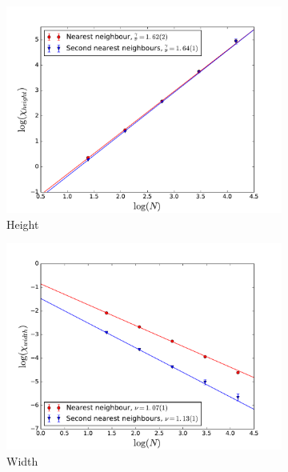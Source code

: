 \documentclass[twoside]{article}
\begin{document}
\begin{figure}[!tpb]
  \begin{subfigure}[b]{0.32\textwidth}
    \includegraphics[width=\textwidth]{images/plot_height.pdf}
    \caption{Height}
    \label{scaling_height}
  \end{subfigure}
  \begin{subfigure}[b]{0.32\textwidth}
    \includegraphics[width=\textwidth]{images/plot_width.pdf}
    \caption{Width}
    \label{scaling_width}
  \end{subfigure}
    \begin{subfigure}[b]{0.32\textwidth}

\end{subfigure}
\end{figure}
\end{document}
